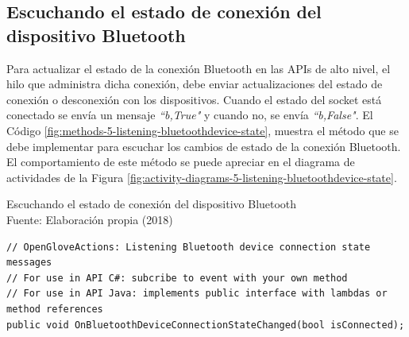 \subsection{Escuchando el estado de conexión del dispositivo Bluetooth}
\label{subsection:reading-bluetooth-device-state}

Para actualizar el estado de la conexión Bluetooth en las APIs de alto nivel, el hilo que administra dicha conexión, debe enviar  actualizaciones del estado de conexión o desconexión con los dispositivos. Cuando el estado del socket está conectado se envía un mensaje  \textit{``b,True"}  y cuando no, se envía \textit{``b,False"}. El Código \ref{fig:methods-5-listening-bluetoothdevice-state}, muestra el método que se debe implementar para escuchar los cambios de estado de la conexión Bluetooth.  El comportamiento de este método se puede apreciar en el diagrama de actividades de la Figura \ref{fig:activity-diagrams-5-listening-bluetoothdevice-state}.

\begin{algorithm}[!ht]
  \begin{center}
   	\captionsetup{justification=centering}
    \caption[Escuchando el estado de conexión del dispositivo Bluetooth]{Escuchando el estado de conexión del dispositivo Bluetooth\\ \tab[4cm] Fuente: Elaboración propia (2018)}
    \label{fig:methods-5-listening-bluetoothdevice-state}
  \end{center}
  \begin{lstlisting}
// OpenGloveActions: Listening Bluetooth device connection state messages
// For use in API C#: subcribe to event with your own method
// For use in API Java: implements public interface with lambdas or method references
public void OnBluetoothDeviceConnectionStateChanged(bool isConnected);
\end{lstlisting}
\end{algorithm}


